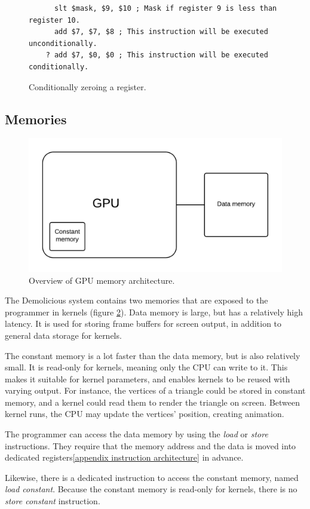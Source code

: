\begin{figure}[H]
	\centering
	\begin{verbatim}
	  slt $mask, $9, $10 ; Mask if register 9 is less than register 10.
	  add $7, $7, $8 ; This instruction will be executed unconditionally.
	? add $7, $0, $0 ; This instruction will be executed conditionally.
	\end{verbatim}
	\caption{Conditionally zeroing a register.}
	\label{fig:conditional_execution}
\end{figure}

\subsection{Memories}

\begin{figure}[H]
	\centering
	\includegraphics[width=\textwidth]{../system_overview/diagrams/memory_overview.png}
	\caption{Overview of GPU memory architecture.}
	\label{fig:memory_overview}
\end{figure}
The Demolicious system contains two memories that are exposed to the programmer in kernels (figure \ref{fig:memory_overview}).
Data memory is large, but has a relatively high latency.
It is used for storing frame buffers for screen output,
in addition to general data storage for kernels.

The constant memory is a lot faster than the data memory, but is also relatively small.
It is read-only for kernels, meaning only the CPU can write to it.
This makes it suitable for kernel parameters, and enables kernels to be reused with varying output.
For instance, the vertices of a triangle could be stored in constant memory,
and a kernel could read them to render the triangle on screen.
Between kernel runs, the CPU may update the vertices' position, creating animation.

The programmer can access the data memory by using the \textit{load} or \textit{store} instructions.
They require that the memory address and the data is moved into dedicated registers\ref{appendix instruction architecture} in advance.

Likewise, there is a dedicated instruction to access the constant memory, named \textit{load constant}.
Because the constant memory is read-only for kernels, there is no \textit{store constant} instruction.
